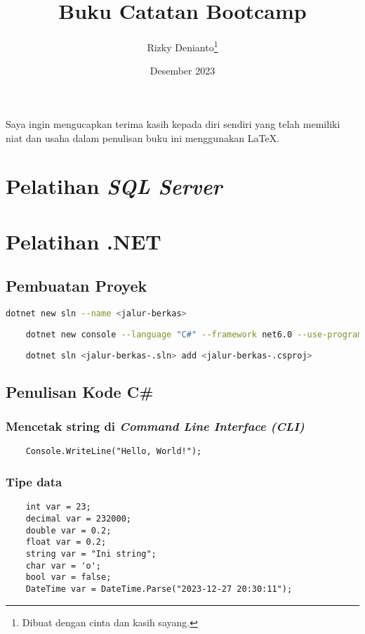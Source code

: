 \documentclass{book}
\title{Buku Catatan Bootcamp}
\author{Rizky Denianto\thanks{Dibuat dengan cinta dan kasih sayang.}}
\date{Desember 2023}
\begin{document}
	\maketitle
	
	Saya ingin mengucapkan terima kasih kepada diri sendiri yang telah memiliki niat dan usaha dalam penulisan buku ini menggunakan \LaTeX.
	
	\tableofcontents
	
	\chapter{Pelatihan \textit{SQL Server}}
	
	\chapter{Pelatihan .NET}
	
	\section{Pembuatan Proyek}
	\begin{lstlisting}[language=bash]
	dotnet new sln --name <jalur-berkas>
		
	dotnet new console --language "C#" --framework net6.0 --use-program-main --output <jalur-berkas>
	
	dotnet sln <jalur-berkas-.sln> add <jalur-berkas-.csproj>
	\end{lstlisting}
	
	\section{Penulisan Kode C\#}
	
	\subsection{Mencetak string di \textit{Command Line Interface (CLI)}}
	\begin{lstlisting}
	Console.WriteLine("Hello, World!");
	\end{lstlisting}
	
	\subsection{Tipe data}
	\begin{lstlisting}
	int var = 23;
	decimal var = 232000;
	double var = 0.2;
	float var = 0.2;
	string var = "Ini string";
	char var = 'o';
	bool var = false;
	DateTime var = DateTime.Parse("2023-12-27 20:30:11");
	\end{lstlisting}
	
\end{document}
